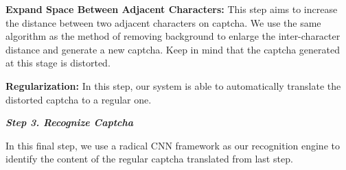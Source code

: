 \noindent \circling{\textcolor{white}{2}} \textbf{Expand Space Between Adjacent Characters:} This step aims to increase the distance between two adjacent characters on captcha. We use the same algorithm as the method of removing background to enlarge the inter-character distance and generate a new captcha. Keep in mind that the captcha generated at this stage is distorted.

\noindent \circling{\textcolor{white}{3}} \textbf{Regularization:} In this step, our system is able to automatically translate the distorted captcha to a regular one.

\noindent \textbf{\emph{Step 3. Recognize Captcha}}

In this final step, we use a radical CNN framework as our recognition engine to identify the content of the regular captcha translated from last step.



